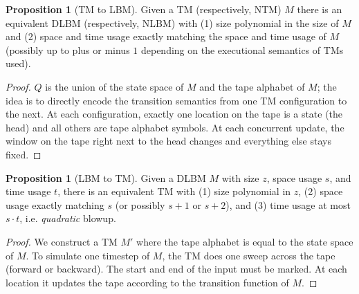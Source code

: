 \documentclass{article}
\theoremstyle{definition}
\newtheorem{prop}[thm]{Proposition}
\begin{document}
\begin{prop}[TM to LBM]
Given a TM (respectively, NTM) $M$ there is an equivalent DLBM (respectively, NLBM) with (1) size polynomial in the size of $M$ and (2) space and time usage exactly matching the space and time usage of $M$ (possibly up to plus or minus $1$ depending on the executional semantics of TMs used).
\end{prop}
\begin{proof}
$Q$ is the union of the state space of $M$ and the tape alphabet of $M$;
the idea is to directly encode the transition semantics from one TM configuration to the next.
At each configuration, exactly one location on the tape is a state (the head) and all
others are tape alphabet symbols. At each concurrent update, the window
on the tape right next to the head changes and everything else stays fixed.
\end{proof}

\begin{prop}[LBM to TM]
Given a DLBM $M$ with size $z$, space usage $s$, and time usage $t$,
there is an equivalent TM with (1) size polynomial in $z$, (2) space usage exactly matching $s$ (or possibly $s+1$ or $s+2$), and (3) time usage at most $s \cdot t$, i.e. \emph{quadratic} blowup.
\end{prop}
\begin{proof}
We construct a TM $M'$ where the tape alphabet is equal to the state
space of $M$.
To simulate one timestep of $M$, the TM does one sweep across the tape
(forward or backward).
The start and end of the input must be marked.
At each location it updates the tape according
to the transition function of $M$.
\end{proof}
\end{document}
